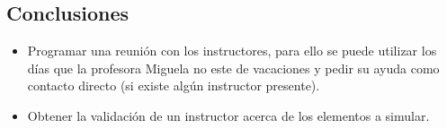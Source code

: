 \subsection{Conclusiones}

\begin{itemize}
\itemsep1pt\parskip0pt
\item
  Programar una reunión con los instructores, para ello se puede
  utilizar los días que la profesora Miguela no este de vacaciones y
  pedir su ayuda como contacto directo (si existe algún instructor
  presente).
\item
  Obtener la validación de un instructor acerca de los elementos a
  simular.
\end{itemize}
